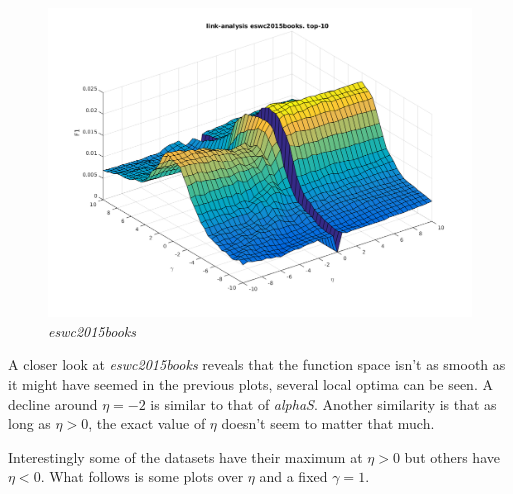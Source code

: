 \FloatBarrier

\begin{figure}[h!]
    \includegraphics[width=\textwidth]{fig/link_eta_gamma/eswc2015books_link.png}
    \caption{\textit{eswc2015books}}
\end{figure}

\FloatBarrier

A closer look at \textit{eswc2015books} reveals that the function space isn't as smooth as it might have seemed in the previous plots, several local optima can be seen. A decline around $\eta = -2$ is similar to that of \textit{alphaS}. Another similarity is that as long as $\eta > 0$, the exact value of $\eta$ doesn't seem to matter that much.

\newpage

Interestingly some of the datasets have their maximum at $\eta > 0$ but others have $\eta < 0$. What follows is some plots over $\eta$ and a fixed $\gamma = 1$.

\FloatBarrier

